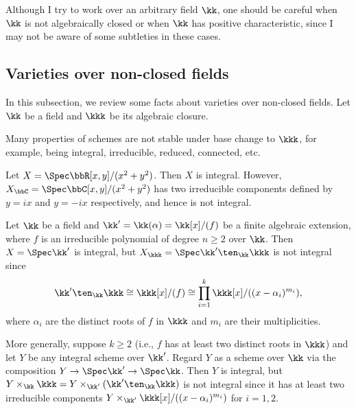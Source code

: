   \begin{remark}
    Although I try to work over an arbitrary field $\kk$, 
    one should be careful when $\kk$ is not algebraically closed or when $\kk$ has positive characteristic, since I may not be aware of some subtleties in these cases.
     \Yang{}
  \end{remark}





\subsection{Varieties over non-closed fields}

  In this subsection, we review some facts about varieties over non-closed fields.
  Let $\kk$ be a field and $\kkk$ be its algebraic closure.

  Many properties of schemes are not stable under base change to $\kkk$, for example, being integral, irreducible, reduced, connected, etc.

  \begin{example}
    Let $X = \Spec \bbR[x,y]/(x^2 + y^2)$.
    Then $X$ is integral.
    However, $X_\bbC = \Spec \bbC[x,y]/(x^2 + y^2)$ has two irreducible components defined by $y = ix$ and $y = -ix$ respectively, and hence is not integral.
  \end{example}

  \begin{example}\label{eg:algebraic_extension_and_geometrically_integrality}
    Let $\kk$ be a field and $\kk' = \kk(\alpha) = \kk[x]/(f)$ be a finite algebraic extension, where $f$ is an irreducible polynomial of degree $n \geq 2$ over $\kk$.
    Then $X = \Spec \kk'$ is integral, but $X_\kkk = \Spec \kk' \ten_\kk \kkk$ is not integral since 
    \[ \kk' \ten_\kk \kkk \cong \kkk[x]/(f) \cong \prod_{i=1}^k \kkk[x]/((x - \alpha_i)^{m_i}), \] 
    where $\alpha_i$ are the distinct roots of $f$ in $\kkk$ and $m_i$ are their multiplicities.

    More generally, suppose $k \geq 2$ (i.e., $f$ has at least two distinct roots in $\kkk$) and let $Y$ be any integral scheme over $\kk'$.
    Regard $Y$ as a scheme over $\kk$ via the composition $Y \to \Spec \kk' \to \Spec \kk$.
    Then $Y$ is integral, but $Y \times_\kk \kkk = Y \times_{\kk'} (\kk' \ten_\kk \kkk)$ is not integral since it has at least two irreducible components $Y \times_{\kk'} \kkk[x]/((x - \alpha_i)^{m_i})$ for $i = 1, 2$.
  \end{example}

